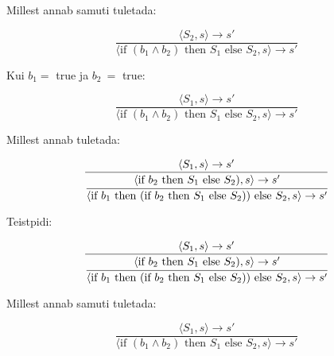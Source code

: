 Millest annab samuti tuletada:

\[
  \frac{
    \langle S_2, s \rangle \rightarrow s'
  }
  {
    \langle \text{if } (b_1 \wedge b_2) \text{ then } S_1 \text{ else }
    S_2, s \rangle \rightarrow s'
  }
\]


Kui \(b_1 =\) true ja \(b_2\ =\) true:

\[
  \frac{
    \langle S_1, s \rangle \rightarrow s'
  }
  {
    \langle \text{if } (b_1 \wedge b_2) \text{ then } S_1 \text{ else }
    S_2, s \rangle \rightarrow s'
  }
\]

Millest annab tuletada:

\[
  \frac{
    \langle S_1, s \rangle \rightarrow s'
  }{
    \cfrac{
      \langle \text{if } b_2 \text{ then } S_1 \text{ else }
      S_2), s \rangle \rightarrow s'
    }{
      \langle \text{if } b_1 \text{ then } (\text{if } b_2 \text{ then } S_1 \text{ else }
      S_2)) \text{ else } S_2, s \rangle \rightarrow s'
    }
  }
\]

Teistpidi:

\[
  \frac{
    \langle S_1, s \rangle \rightarrow s'
  }{
    \cfrac{
      \langle \text{if } b_2 \text{ then } S_1 \text{ else }
      S_2), s \rangle \rightarrow s'
    }{
      \langle \text{if } b_1 \text{ then } (\text{if } b_2 \text{ then } S_1 \text{ else }
      S_2)) \text{ else } S_2, s \rangle \rightarrow s'
    }
  }
\]

Millest annab samuti tuletada:

\[
  \frac{
    \langle S_1, s \rangle \rightarrow s'
  }
  {
    \langle \text{if } (b_1 \wedge b_2) \text{ then } S_1 \text{ else }
    S_2, s \rangle \rightarrow s'
  }
\]


